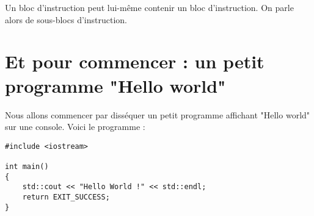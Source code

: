 Un bloc d'instruction peut lui-même contenir un bloc d'instruction. On parle alors de sous-blocs d'instruction.

\section{Et pour commencer : un petit programme "Hello world"}

Nous allons commencer par disséquer un petit programme affichant "Hello world" sur une console. Voici le programme :
\begin{lstlisting}[stepnumber=1,caption=Un programme Hello World !]
#include <iostream>

int main()
{
    std::cout << "Hello World !" << std::endl;
    return EXIT_SUCCESS;
}
\end{lstlisting}

